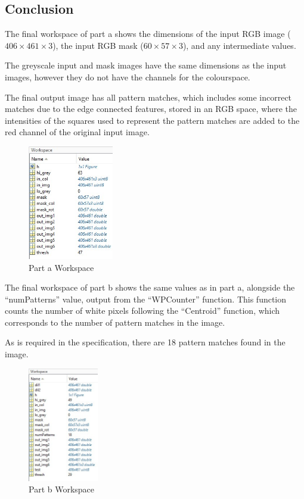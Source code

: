 \documentclass[a4paper]{article}
\begin{document}
	\subsection{Conclusion}
	The final workspace of part a shows the dimensions of the input RGB
	image ($406 \times 461 \times 3$), the input RGB mask ($60 \times 57
	\times 3$), and any intermediate values.
	 \par The greyscale input and mask images have the same dimensions as
	 the input images, however they do not have the channels for the
	 colourspace.
	 \par The final output image has all pattern matches, which includes
	 some incorrect matches due to the edge connected features, stored in an
	 RGB space, where the intensities of the squares used to represent the
	 pattern matches are added to the red channel of the original input
	 image.
	\begin{figure}[H]
		\centering
		\includegraphics[height=5cm]{Results/Q3/a/Workspace.jpg}%
		\caption{Part a Workspace}
		\label{fig:}
	\end{figure}
	\par The final workspace of part b shows the same values as in part a,
	alongside the ``numPatterns'' value, output from the ``WPCounter''
	function. This function counts the number of white pixels following the
	``Centroid'' function, which corresponds to the number of pattern
	matches in the image.
	\par As is required in the specification, there are 18 pattern matches
	found in the image.
	\begin{figure}[H]
		\centering
		\includegraphics[height=5cm]{Results/Q3/b/Workspace.jpg}%
		\caption{Part b Workspace}
		\label{fig:}
	\end{figure}
\end{document}

